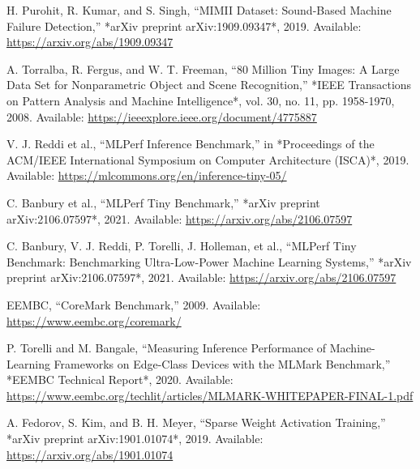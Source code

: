 \documentclass[conference]{IEEEtran}
\begin{document}
\begin{thebibliography}{00}
 H. Purohit, R. Kumar, and S. Singh, ``MIMII Dataset: Sound-Based Machine Failure Detection,'' *arXiv preprint arXiv:1909.09347*, 2019. Available: \url{https://arxiv.org/abs/1909.09347}

 A. Torralba, R. Fergus, and W. T. Freeman, ``80 Million Tiny Images: A Large Data Set for Nonparametric Object and Scene Recognition,'' *IEEE Transactions on Pattern Analysis and Machine Intelligence*, vol. 30, no. 11, pp. 1958-1970, 2008. Available: \url{https://ieeexplore.ieee.org/document/4775887}




 V. J. Reddi et al., ``MLPerf Inference Benchmark,'' in *Proceedings of the ACM/IEEE International Symposium on Computer Architecture (ISCA)*, 2019. Available: \url{https://mlcommons.org/en/inference-tiny-05/}

 C. Banbury et al., ``MLPerf Tiny Benchmark,'' *arXiv preprint arXiv:2106.07597*, 2021. Available: \url{https://arxiv.org/abs/2106.07597}

 C. Banbury, V. J. Reddi, P. Torelli, J. Holleman, et al., ``MLPerf Tiny Benchmark: Benchmarking Ultra-Low-Power Machine Learning Systems,'' *arXiv preprint arXiv:2106.07597*, 2021. Available: \url{https://arxiv.org/abs/2106.07597}

 EEMBC, ``CoreMark Benchmark,'' 2009. Available: \url{https://www.eembc.org/coremark/}

 P. Torelli and M. Bangale, ``Measuring Inference Performance of Machine-Learning Frameworks on Edge-Class Devices with the MLMark Benchmark,'' *EEMBC Technical Report*, 2020. Available: \url{https://www.eembc.org/techlit/articles/MLMARK-WHITEPAPER-FINAL-1.pdf}

 A. Fedorov, S. Kim, and B. H. Meyer, ``Sparse Weight Activation Training,'' *arXiv preprint arXiv:1901.01074*, 2019. Available: \url{https://arxiv.org/abs/1901.01074}

\end{thebibliography}

\vspace{12pt}
\end{document}
